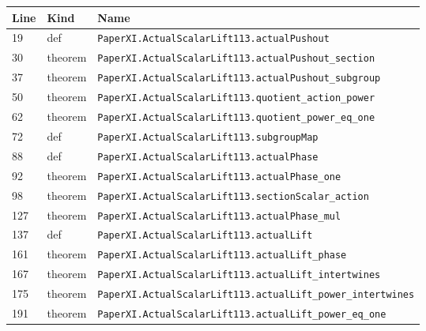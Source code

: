 \documentclass[10pt,oneside]{book}
\begin{document}
\begin{longtable}{@{}p{}p{}p{}@{}}\toprule Line&Kind&Name\\\midrule\endhead

19&def&\nolinkurl{PaperXI.ActualScalarLift113.actualPushout}\\

30&theorem&\nolinkurl{PaperXI.ActualScalarLift113.actualPushout_section}\\

37&theorem&\nolinkurl{PaperXI.ActualScalarLift113.actualPushout_subgroup}\\

50&theorem&\nolinkurl{PaperXI.ActualScalarLift113.quotient_action_power}\\

62&theorem&\nolinkurl{PaperXI.ActualScalarLift113.quotient_power_eq_one}\\

72&def&\nolinkurl{PaperXI.ActualScalarLift113.subgroupMap}\\

88&def&\nolinkurl{PaperXI.ActualScalarLift113.actualPhase}\\

92&theorem&\nolinkurl{PaperXI.ActualScalarLift113.actualPhase_one}\\

98&theorem&\nolinkurl{PaperXI.ActualScalarLift113.sectionScalar_action}\\

127&theorem&\nolinkurl{PaperXI.ActualScalarLift113.actualPhase_mul}\\

137&def&\nolinkurl{PaperXI.ActualScalarLift113.actualLift}\\

161&theorem&\nolinkurl{PaperXI.ActualScalarLift113.actualLift_phase}\\

167&theorem&\nolinkurl{PaperXI.ActualScalarLift113.actualLift_intertwines}\\

175&theorem&\nolinkurl{PaperXI.ActualScalarLift113.actualLift_power_intertwines}\\

191&theorem&\nolinkurl{PaperXI.ActualScalarLift113.actualLift_power_eq_one}\\

\bottomrule\end{longtable}
\end{document}
